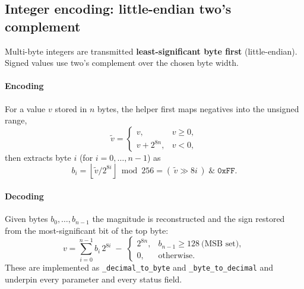 \documentclass[11pt,a4paper]{article}
\newcommand{\code}[1]{\texttt{#1}}
\begin{document}
\subsection{Integer encoding: little-endian two's complement}
Multi-byte integers are transmitted \textbf{least-significant byte first}
(little-endian). Signed values use two's complement over the chosen byte width.

\paragraph{Encoding} For a value $v$ stored in $n$ bytes, the helper first maps
negatives into the unsigned range,
\begin{equation}
  \tilde v =
  \begin{cases}
    v, & v \ge 0,\\[2pt]
    v + 2^{8n}, & v < 0,
  \end{cases}
\end{equation}
then extracts byte $i$ (for $i = 0,\dots,n-1$) as
\begin{equation}
  b_i = \left\lfloor \tilde v / 2^{8i} \right\rfloor \bmod 256
       = (\,\tilde v \gg 8i\,)\;\&\;\mathtt{0xFF}.
\end{equation}

\paragraph{Decoding} Given bytes $b_0,\dots,b_{n-1}$ the magnitude is
reconstructed and the sign restored from the most-significant bit of the top
byte:
\begin{equation}
  v = \sum_{i=0}^{n-1} b_i\,2^{8i}
      \;-\;
      \begin{cases}
        2^{8n}, & b_{n-1} \ge 128 \ \text{(MSB set)},\\
        0, & \text{otherwise.}
      \end{cases}
\end{equation}
These are implemented as \code{\_decimal\_to\_byte} and
\code{\_byte\_to\_decimal} and underpin every parameter and every status field.
\end{document}
